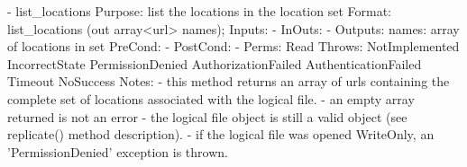 \begin{myspec}
 
    - list_locations
      Purpose:  list the locations in the location set
      Format:   list_locations   (out array<url>       names);
      Inputs:   -
      InOuts:   -
      Outputs:  names:            array of locations in set
      PreCond:  -
      PostCond: - 
      Perms:    Read
      Throws:   NotImplemented
                IncorrectState
                PermissionDenied
                AuthorizationFailed
                AuthenticationFailed
                Timeout
                NoSuccess
      Notes:    - this method returns an array of urls
                  containing the complete set of locations
                  associated with the logical file.
                - an empty array returned is not an error - 
                  the logical file object is still a valid 
                  object (see replicate() method description).
                - if the logical file was opened WriteOnly, an
                  'PermissionDenied' exception is thrown.
 

\end{myspec}
